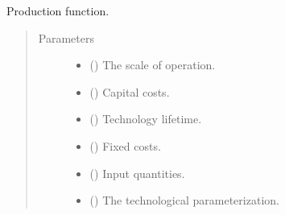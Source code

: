 \documentclass[letterpaper,10pt,english]{sphinxmanual}
\begin{document}
\begin{fulllineitems}
\label{\detokenize{doc-src/technology:technology.pv_residential_generic.production}}
Production function.
\begin{quote}\begin{description}
\item[{Parameters}] \leavevmode\begin{itemize}
\item {} 
 () \textendash{} The scale of operation.

\item {} 
 () \textendash{} Capital costs.

\item {} 
 () \textendash{} Technology lifetime.

\item {} 
 () \textendash{} Fixed costs.

\item {} 
 () \textendash{} Input quantities.

\item {} 
 () \textendash{} The technological parameterization.

\end{itemize}

\end{description}\end{quote}

\end{fulllineitems}

\end{document}
